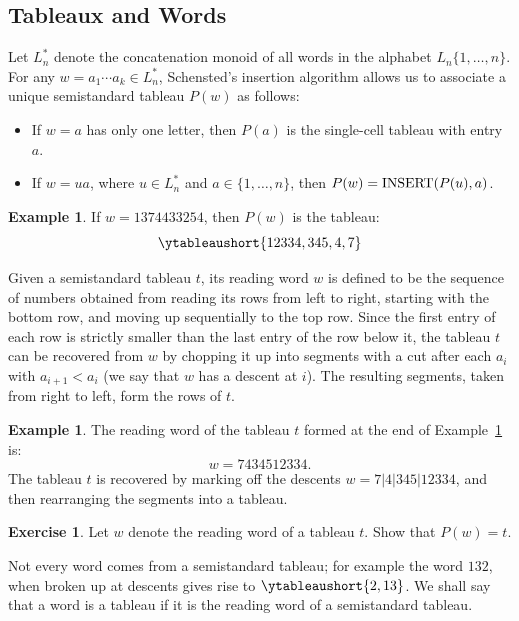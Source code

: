 \documentclass[11pt]{amsproc}
\theoremstyle{definition}
\theoremstyle{example}
\newtheorem{example}[theorem]{Example}
\newtheorem{exercise}[theorem]{Exercise}
\newcommand{\ins}{\textup{INSERT}}
\begin{document}
\subsection{Tableaux and Words}
\label{sec:tabl-assoc-word}
Let $L^*_n$ denote the concatenation monoid of all words in the alphabet $L_n\{1,\dotsc,n\}$.
For any $w=a_1\dotsb a_k\in L^*_n$, Schensted's insertion algorithm allows us to associate a unique semistandard tableau $P(w)$ as follows:
\begin{itemize}
\item If $w=a$ has only one letter, then $P(a)$ is the single-cell tableau with entry $a$.
\item If $w=ua$, where $u\in L_n^*$ and $a\in \{1,\dotsc,n\}$, then \linebreak $P(w)=\ins(P(u), a)$.
\end{itemize}
\begin{example}
  \label{example:insertion}
  If $w=1374433254$, then $P(w)$ is the tableau:
  \begin{displaymath}
    \ytableaushort{12334,345,4,7}
  \end{displaymath}
\end{example}
\label{sec:tableau-as-words}
Given a semistandard tableau $t$, its reading word $w$ is defined to be the sequence of numbers obtained from reading its rows from left to right, starting with the bottom row, and moving up sequentially to the top row.
Since the first entry of each row is strictly smaller than the last entry of the row below it, the tableau $t$ can be recovered from $w$ by chopping it up into segments with a cut after each $a_i$ with $a_{i+1}<a_i$ (we say that $w$ has a descent at $i$). The resulting segments, taken from right to left, form the rows of $t$.
\begin{example}
  The reading word of the tableau $t$ formed at the end of Example~\ref{example:insertion} is:
  \begin{displaymath}
    w = 7434512334.
  \end{displaymath}
  The tableau $t$ is recovered by marking off the descents $w = 7|4|345|12334$, and then rearranging the segments into a tableau.
\end{example}
\begin{exercise}
  \label{exercise:tableau-word}
  Let $w$ denote the reading word of a tableau $t$.
  Show that $P(w)=t$.
\end{exercise}
Not every word comes from a semistandard tableau; for example the word $132$, when broken up at descents gives rise to $\ytableaushort{2,13}$.
We shall say that a word is a tableau if it is the reading word of a semistandard tableau.
\end{document}
